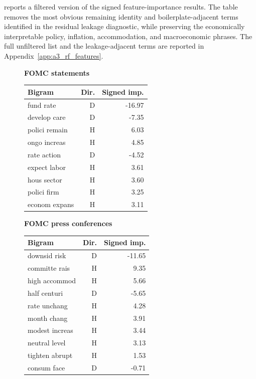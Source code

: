  reports a filtered version of the
signed feature-importance results. The table removes the most obvious
remaining identity and boilerplate-adjacent terms identified in the residual
leakage diagnostic, while preserving the economically interpretable policy,
inflation, accommodation, and macroeconomic phrases. The full unfiltered list
and the leakage-adjacent terms are reported in Appendix~\ref{app:a3_rf_features}.

\begin{figure}[H]
  \centering
\begin{minipage}{0.48\textwidth}
\centering
\scriptsize
\textbf{FOMC statements}\par
\vspace{0.08cm}
\begin{tabular}{lrr}
\toprule
Bigram & Dir. & Signed imp. \\
\midrule
fund rate & D & -16.97 \\
develop care & D & -7.35 \\
polici remain & H & 6.03 \\
ongo increas & H & 4.85 \\
rate action & D & -4.52 \\
expect labor & H & 3.61 \\
hous sector & H & 3.60 \\
polici firm & H & 3.25 \\
econom expans & H & 3.11 \\
\bottomrule
\end{tabular}
\end{minipage}
\hfill
\begin{minipage}{0.48\textwidth}
\centering
\scriptsize
\textbf{FOMC press conferences}\par
\vspace{0.08cm}
\begin{tabular}{lrr}
\toprule
Bigram & Dir. & Signed imp. \\
\midrule
downsid risk & D & -11.65 \\
committe rais & H & 9.35 \\
high accommod & H & 5.66 \\
half centuri & D & -5.65 \\
rate unchang & H & 4.28 \\
month chang & H & 3.91 \\
modest increas & H & 3.44 \\
neutral level & H & 3.13 \\
tighten abrupt & H & 1.53 \\
consum face & D & -0.71 \\
\bottomrule
\end{tabular}
\end{minipage}


\end{figure}

